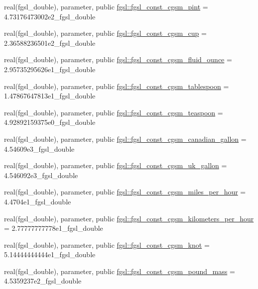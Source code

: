 \begin{DoxyCompactItemize}
\item 
real(fgsl\+\_\+double), parameter, public \hyperlink{namespacefgsl_a77fc850550f8adbaa35a17890fe1ddb6}{fgsl\+::fgsl\+\_\+const\+\_\+cgsm\+\_\+pint} = 4.\+73176473002e2\+\_\+fgsl\+\_\+double
\item 
real(fgsl\+\_\+double), parameter, public \hyperlink{namespacefgsl_aa3f891d5605128364396d3ae108b3d43}{fgsl\+::fgsl\+\_\+const\+\_\+cgsm\+\_\+cup} = 2.\+36588236501e2\+\_\+fgsl\+\_\+double
\item 
real(fgsl\+\_\+double), parameter, public \hyperlink{namespacefgsl_ada803a980994f045ecc9fa32cebad23b}{fgsl\+::fgsl\+\_\+const\+\_\+cgsm\+\_\+fluid\+\_\+ounce} = 2.\+95735295626e1\+\_\+fgsl\+\_\+double
\item 
real(fgsl\+\_\+double), parameter, public \hyperlink{namespacefgsl_ad8c01acfc1ba5ba62f1c97aa1b0d8142}{fgsl\+::fgsl\+\_\+const\+\_\+cgsm\+\_\+tablespoon} = 1.\+47867647813e1\+\_\+fgsl\+\_\+double
\item 
real(fgsl\+\_\+double), parameter, public \hyperlink{namespacefgsl_a46a096885f2709ea27ce6f1b8f59c279}{fgsl\+::fgsl\+\_\+const\+\_\+cgsm\+\_\+teaspoon} = 4.\+92892159375e0\+\_\+fgsl\+\_\+double
\item 
real(fgsl\+\_\+double), parameter, public \hyperlink{namespacefgsl_a3a07299d97f40e47785e44126a457907}{fgsl\+::fgsl\+\_\+const\+\_\+cgsm\+\_\+canadian\+\_\+gallon} = 4.\+54609e3\+\_\+fgsl\+\_\+double
\item 
real(fgsl\+\_\+double), parameter, public \hyperlink{namespacefgsl_aaa815df0586e577834ad13d9b6dd8218}{fgsl\+::fgsl\+\_\+const\+\_\+cgsm\+\_\+uk\+\_\+gallon} = 4.\+546092e3\+\_\+fgsl\+\_\+double
\item 
real(fgsl\+\_\+double), parameter, public \hyperlink{namespacefgsl_a021d66524bb3e4b9305ce5399f11f2ec}{fgsl\+::fgsl\+\_\+const\+\_\+cgsm\+\_\+miles\+\_\+per\+\_\+hour} = 4.\+4704e1\+\_\+fgsl\+\_\+double
\item 
real(fgsl\+\_\+double), parameter, public \hyperlink{namespacefgsl_a302d497108c596ed552f90c728af3002}{fgsl\+::fgsl\+\_\+const\+\_\+cgsm\+\_\+kilometers\+\_\+per\+\_\+hour} = 2.\+77777777778e1\+\_\+fgsl\+\_\+double
\item 
real(fgsl\+\_\+double), parameter, public \hyperlink{namespacefgsl_a7b637a368f16bed373b7ff18193b8417}{fgsl\+::fgsl\+\_\+const\+\_\+cgsm\+\_\+knot} = 5.\+14444444444e1\+\_\+fgsl\+\_\+double
\item 
real(fgsl\+\_\+double), parameter, public \hyperlink{namespacefgsl_ae6b5172d0dcea9b11e99852be3ec5f1a}{fgsl\+::fgsl\+\_\+const\+\_\+cgsm\+\_\+pound\+\_\+mass} = 4.\+5359237e2\+\_\+fgsl\+\_\+double

\end{DoxyCompactItemize}
